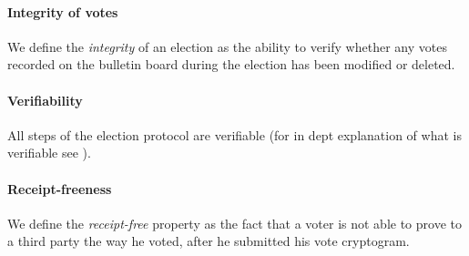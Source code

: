 \paragraph{Integrity of votes}
We define the \textit{integrity} of an election as the ability to verify whether any votes recorded on the bulletin board during the election has been modified or deleted.

\paragraph{Verifiability}
All steps of the election protocol are verifiable (for in dept explanation of what is verifiable see ).

\paragraph{Receipt-freeness}

We define the \textit{receipt-free} property as the fact that a voter is not able to prove to a third party the way he voted, after he submitted his vote cryptogram.
